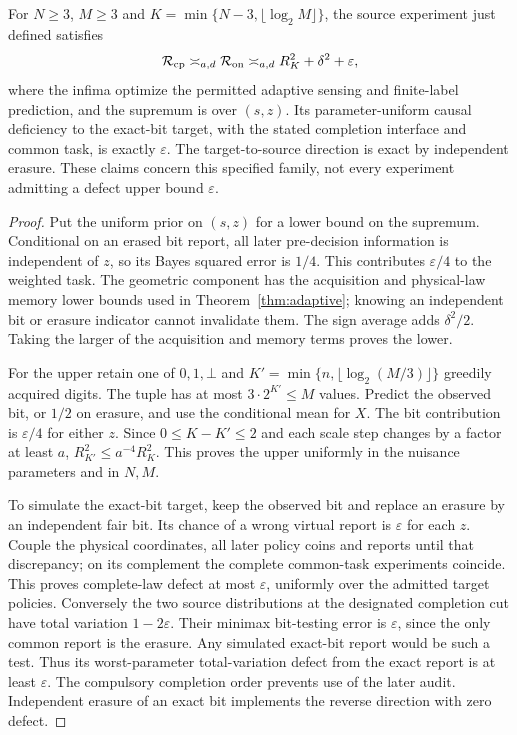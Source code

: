 \begin{theorem}\label{thm:joint}
For $N\ge3$, $M\ge3$ and $K=\min\{N-3,\lfloor\log_2M\rfloor\}$, the source experiment just defined satisfies
\begin{equation}\label{eq:jointlaw}
 \mathcal R_{\mathrm{cp}}\asymp_{a,d}\mathcal R_{\mathrm{on}}
 \asymp_{a,d}R_K^2+\delta^2+\varepsilon,
\end{equation}
where the infima optimize the permitted adaptive sensing and finite-label prediction, and the supremum is over $(s,z)$. Its parameter-uniform causal deficiency to the exact-bit target, with the stated completion interface and common task, is exactly $\varepsilon$. The target-to-source direction is exact by independent erasure. These claims concern this specified family, not every experiment admitting a defect upper bound $\varepsilon$.
\end{theorem}
\begin{proof}
Put the uniform prior on $(s,z)$ for a lower bound on the supremum. Conditional on an erased bit report, all later pre-decision information is independent of $z$, so its Bayes squared error is $1/4$. This contributes $\varepsilon/4$ to the weighted task. The geometric component has the acquisition and physical-law memory lower bounds used in Theorem~\ref{thm:adaptive}; knowing an independent bit or erasure indicator cannot invalidate them. The sign average adds $\delta^2/2$. Taking the larger of the acquisition and memory terms proves the lower.

For the upper retain one of $0,1,\bot$ and $K'=\min\{n,\lfloor\log_2(M/3)\rfloor\}$ greedily acquired digits. The tuple has at most $3\cdot2^{K'}\le M$ values. Predict the observed bit, or $1/2$ on erasure, and use the conditional mean for $X$. The bit contribution is $\varepsilon/4$ for either $z$. Since $0\le K-K'\le2$ and each scale step changes by a factor at least $a$, $R_{K'}^2\le a^{-4}R_K^2$. This proves the upper uniformly in the nuisance parameters and in $N,M$.

To simulate the exact-bit target, keep the observed bit and replace an erasure by an independent fair bit. Its chance of a wrong virtual report is $\varepsilon$ for each $z$. Couple the physical coordinates, all later policy coins and reports until that discrepancy; on its complement the complete common-task experiments coincide. This proves complete-law defect at most $\varepsilon$, uniformly over the admitted target policies. Conversely the two source distributions at the designated completion cut have total variation $1-2\varepsilon$. Their minimax bit-testing error is $\varepsilon$, since the only common report is the erasure. Any simulated exact-bit report would be such a test. Thus its worst-parameter total-variation defect from the exact report is at least $\varepsilon$. The compulsory completion order prevents use of the later audit. Independent erasure of an exact bit implements the reverse direction with zero defect.
\end{proof}

